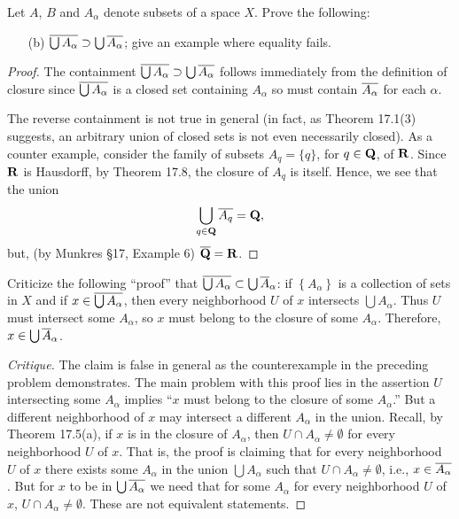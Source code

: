 \newpage
\begin{problem}
Let $A$, $B$ and $A_\alpha$ denote subsets of a space $X$. Prove
the following:
\begin{enumerate}[noitemsep]
\item[(b)] $\overline{\bigcup
    A_\alpha}\supset\bigcup\overline{A_\alpha}$; give an example
  where equality fails.
\end{enumerate}
\end{problem}
\begin{proof}
The containment $\overline{\bigcup
  A_\alpha}\supset\bigcup\overline{A_\alpha}$ follows immediately
from the definition of closure since $\overline{\bigcup A_\alpha}$ is
a closed set containing $A_\alpha$ so must contain
$\overline{A_\alpha}$ for each $\alpha$.

The reverse containment is not true in general (in fact, as
Theorem 17.1(3) suggests, an arbitrary union of closed sets is
not even necessarily closed). As a counter example, consider the
family of subsets $A_q=\{q\}$, for $q\in\mathbf{Q}$, of $\mathbf{R}$. Since
$\mathbf{R}$ is Hausdorff, by Theorem 17.8, the closure of $A_q$ is
itself. Hence, we see that the union
\[
\bigcup_{q\in\mathbf{Q}}\overline{A_q}=\mathbf{Q},
\]
but, (by Munkres \S17, Example 6) $\overline{\mathbf{Q}}=\mathbf{R}$.
\end{proof}
\newpage
\begin{problem}
Criticize the following ``proof'' that $\overline{\bigcup
  A_\alpha}\subset\bigcup\overline{A}_\alpha$: if
$\left\{A_\alpha\right\}$ is a collection of sets in $X$ and if
$x\in\overline{\bigcup A_\alpha}$, then every neighborhood $U$ of $x$
intersects $\bigcup A_\alpha$. Thus $U$ must intersect some
$A_\alpha$, so $x$ must belong to the closure of some
$A_\alpha$. Therefore, $x\in\bigcup\overline{A}_\alpha$.
\end{problem}
\begin{proof}[Critique]
\renewcommand\qedsymbol{$\varheartsuit$}
The claim is false in general as the counterexample in the
preceding problem demonstrates. The main problem with this proof
lies in the assertion $U$ intersecting some $A_\alpha$ implies
``$x$ must belong to the closure of some $A_\alpha$.'' But a
different neighborhood of $x$ may intersect a different
$A_\alpha$ in the union. Recall, by Theorem 17.5(a), if $x$ is in
the closure of $A_\alpha$, then $U\cap A_\alpha\neq\emptyset$ for
every neighborhood $U$ of $x$. That is, the proof is claiming
that for every neighborhood $U$ of $x$ there exists some
$A_\alpha$ in the union $\bigcup A_\alpha$ such that $U\cap
A_\alpha\neq\emptyset$, i.e., $x\in\overline{A_\alpha}$. But for $x$
to be in $\bigcup\overline{A_\alpha}$ we need that for some
$A_\alpha$ for every neighborhood $U$ of $x$, $U\cap
A_\alpha\neq\emptyset$. These are not equivalent statements.
 \end{proof}
